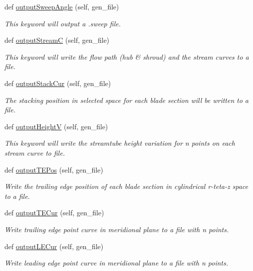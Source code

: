 \begin{DoxyCompactItemize}
def \hyperlink{a00073_a9d8a631853a80acf18ab0d1c05a11dec}{output\+Sweep\+Angle} (self, gen\+\_\+file)
\begin{DoxyCompactList}\small\item\em This keyword will output a .sweep file. \end{DoxyCompactList}\item 
def \hyperlink{a00073_a6dc19a2bae75b4c52b4337a55574363d}{output\+StreamC} (self, gen\+\_\+file)
\begin{DoxyCompactList}\small\item\em This keyword will write the flow path (hub \& shroud) and the stream curves to a file. \end{DoxyCompactList}\item 
def \hyperlink{a00073_a38ac1495c5c1cc730241601a8300d632}{output\+Stack\+Cur} (self, gen\+\_\+file)
\begin{DoxyCompactList}\small\item\em The stacking position in selected space for each blade section will be written to a file. \end{DoxyCompactList}\item 
def \hyperlink{a00073_a15fdf4aaecf99b885796124500f80114}{output\+HeightV} (self, gen\+\_\+file)
\begin{DoxyCompactList}\small\item\em This keyword will write the streamtube height variation for n points on each stream curve to file. \end{DoxyCompactList}\item 
def \hyperlink{a00073_af96b8ec5130403c737d4105e04edea5d}{output\+T\+E\+Pos} (self, gen\+\_\+file)
\begin{DoxyCompactList}\small\item\em Write the trailing edge position of each blade section in cylindrical r-\/teta-\/z space to a file. \end{DoxyCompactList}\item 
def \hyperlink{a00073_a93fdb47e6f9162ce3fe7ef624f7681aa}{output\+T\+E\+Cur} (self, gen\+\_\+file)
\begin{DoxyCompactList}\small\item\em Write trailing edge point curve in meridional plane to a file with n points. \end{DoxyCompactList}\item 
def \hyperlink{a00073_a55ddee4c839782858d6f53a49b9c63ec}{output\+L\+E\+Cur} (self, gen\+\_\+file)
\begin{DoxyCompactList}\small\item\em Write leading edge point curve in meridional plane to a file with n points. \end{DoxyCompactList}\item 

\end{DoxyCompactItemize}
